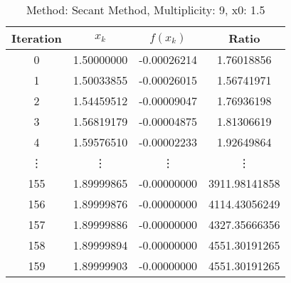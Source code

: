 \begin{table}
\centering
\caption{Method: Secant Method, Multiplicity: 9, x0: 1.5}
\label{tab:table_Secant_Method_9_1_5}
\begin{tabular}{c c c c}
\toprule
Iteration &      $x_k$ &    $f(x_k)$ &         Ratio \\
\midrule
        0 & 1.50000000 & -0.00026214 &    1.76018856 \\
        1 & 1.50033855 & -0.00026015 &    1.56741971 \\
        2 & 1.54459512 & -0.00009047 &    1.76936198 \\
        3 & 1.56819179 & -0.00004875 &    1.81306619 \\
        4 & 1.59576510 & -0.00002233 &    1.92649864 \\
   \vdots &     \vdots &      \vdots &        \vdots \\
      155 & 1.89999865 & -0.00000000 & 3911.98141858 \\
      156 & 1.89999876 & -0.00000000 & 4114.43056249 \\
      157 & 1.89999886 & -0.00000000 & 4327.35666356 \\
      158 & 1.89999894 & -0.00000000 & 4551.30191265 \\
      159 & 1.89999903 & -0.00000000 & 4551.30191265 \\
\bottomrule
\end{tabular}
\end{table}
